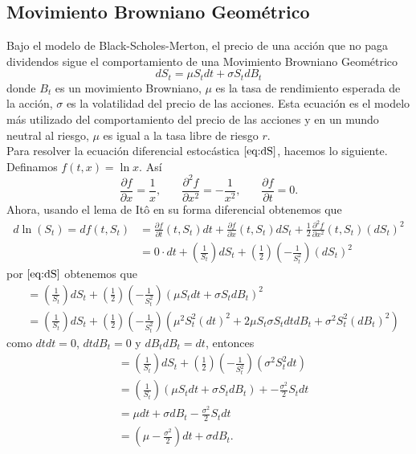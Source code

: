 \documentclass[11pt,notitlepage]{article}
\begin{document}
\subsection*{Movimiento Browniano Geométrico}
Bajo el modelo de Black-Scholes-Merton, el precio de una acción que no paga dividendos sigue el comportamiento de una Movimiento Browniano Geométrico
\begin{equation}
    \label{eq:dS}
    dS_t = \mu S_t dt + \sigma S_t dB_t
\end{equation}
donde $B_t$ es un movimiento Browniano, $\mu$ es la tasa de rendimiento esperada de la acción, $\sigma$ es la volatilidad del precio de las acciones. Esta ecuación es el modelo más utilizado del comportamiento del precio de las acciones y en un mundo neutral al riesgo, $\mu$ es igual a la tasa libre de riesgo $r$.\\
Para resolver la ecuación diferencial estocástica $\eqref{eq:dS}$, hacemos lo siguiente.\\
Definamos $f(t,x) = \ln{x}$. Así
\begin{equation*}
    \frac{\partial f}{\partial x} = \frac{1}{x},
    \ \ \ \ \ \ \ \ \frac{\partial^2 f}{\partial x^2} = -\frac{1}{x^2},
    \ \ \ \ \ \ \ \ \frac{\partial f}{\partial t} = 0.
\end{equation*}
Ahora, usando el lema de Itô en su forma diferencial obtenemos que
\begin{align*}
    d\ln{(S_t)} = df(t, S_t) &= \frac{\partial f}{\partial t} (t, S_t) dt + \frac{\partial f}{\partial x} (t, S_t) dS_t + \frac{1}{2} \frac{\partial^2 f}{\partial x^2} (t, S_t) (dS_t)^2\\
    &= 0 \cdot dt + \left( \frac{1}{S_t} \right) dS_t + \left( \frac{1}{2} \right)\left( - \frac{1}{S_t^2} \right) (dS_t)^2
\end{align*}
por $\eqref{eq:dS}$ obtenemos que
\begin{align*}
    &= \left( \frac{1}{S_t} \right) dS_t + \left( \frac{1}{2} \right)\left( - \frac{1}{S_t^2} \right) ( \mu S_t dt + \sigma S_t dB_t )^2 \\
    &= \left( \frac{1}{S_t} \right) dS_t + \left( \frac{1}{2} \right)\left( - \frac{1}{S_t^2} \right) ( \mu^2 S_t^2 (dt)^2 + 2\mu S_t \sigma S_t dt dB_t + \sigma^2 S_t^2 (dB_t)^2)
\end{align*}
como $dtdt = 0$, $ dtdB_t = 0$ y $dB_tdB_t = dt$, entonces
\begin{align*}
    &= \left( \frac{1}{S_t} \right) dS_t + \left( \frac{1}{2} \right)\left( - \frac{1}{S_t^2} \right) (\sigma^2 S_t^2 dt)\\
    &= \left( \frac{1}{S_t} \right) (\mu S_t dt + \sigma S_t dB_t) + -\frac{\sigma^2}{2} S_t dt\\
    &= \mu dt + \sigma dB_t - \frac{\sigma^2}{2} S_t dt\\
    &= \left(\mu - \frac{\sigma^2}{2}\right) dt + \sigma dB_t.
\end{align*}
\end{document}
